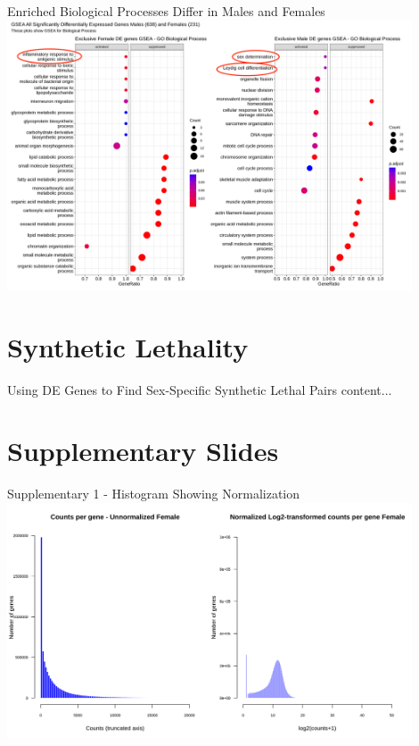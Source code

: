 \documentclass{beamer}
\begin{document}
	\begin{frame}{Enriched Biological Processes Differ in Males and Females}
		\includegraphics[width=12cm, height=8cm]{all_cancersgsea_exclusivedegenes_male_female_bp0.9.png}
	\end{frame}

	\section{Synthetic Lethality}
	\begin{frame}{Using DE Genes to Find Sex-Specific Synthetic Lethal Pairs}
		content...
	\end{frame}

	\section{Supplementary Slides}
	\begin{frame}{Supplementary 1 - Histogram Showing Normalization}
		\includegraphics[width=12cm, height=7cm]{all_cancers-F_before_and_after_normalization_hist.png}
	\end{frame}
\end{document}
